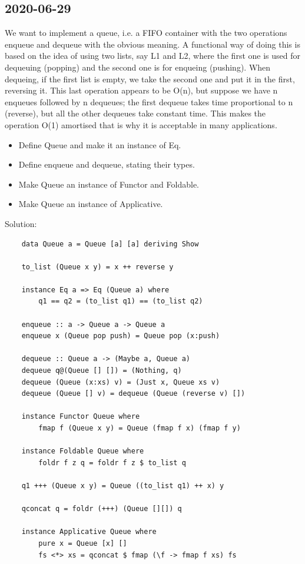 \subsection{2020-06-29}
We want to implement a queue, i.e. a FIFO container with the two operations enqueue and dequeue with the obvious meaning.
A functional way of doing this is based on the idea of using two lists, say L1 and L2, where the first one is used for dequeuing (popping) and the second one is for enqueing (pushing).
When dequeing, if the first list is empty, we take the second one and put it in the
first, reversing it.
This last operation appears to be O(n), but suppose we have n enqueues followed by n dequeues; the first dequeue takes time proportional to n (reverse), but all the other dequeues take constant time.
This makes the operation O(1) amortised that is why it is acceptable in many applications.
\begin{itemize}
	\item Define Queue and make it an instance of Eq.
	\item Define enqueue and dequeue, stating their types.
	\item Make Queue an instance of Functor and Foldable.
	\item Make Queue an instance of Applicative.
\end{itemize}
Solution:
\begin{lstlisting}
	data Queue a = Queue [a] [a] deriving Show
	
	to_list (Queue x y) = x ++ reverse y
	
	instance Eq a => Eq (Queue a) where
		q1 == q2 = (to_list q1) == (to_list q2)
	
	enqueue :: a -> Queue a -> Queue a
	enqueue x (Queue pop push) = Queue pop (x:push)
	
	dequeue :: Queue a -> (Maybe a, Queue a)
	dequeue q@(Queue [] []) = (Nothing, q)
	dequeue (Queue (x:xs) v) = (Just x, Queue xs v)
	dequeue (Queue [] v) = dequeue (Queue (reverse v) [])
	
	instance Functor Queue where
		fmap f (Queue x y) = Queue (fmap f x) (fmap f y)
	
	instance Foldable Queue where
		foldr f z q = foldr f z $ to_list q 
	
	q1 +++ (Queue x y) = Queue ((to_list q1) ++ x) y
	
	qconcat q = foldr (+++) (Queue [][]) q
	
	instance Applicative Queue where
		pure x = Queue [x] []
		fs <*> xs = qconcat $ fmap (\f -> fmap f xs) fs
\end{lstlisting}





